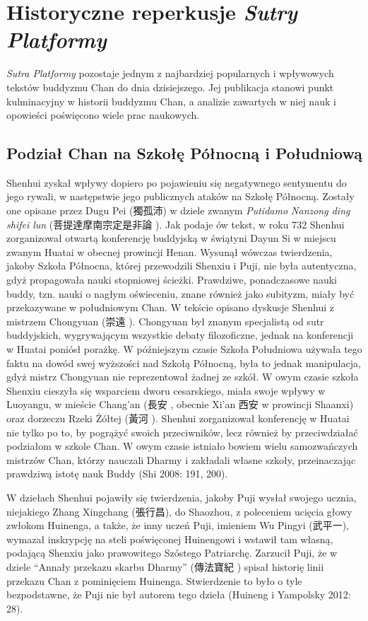 \chapter{Historyczne reperkusje \textit{Sutry Platformy}}
\label{ch:chapter_four}
\textit{Sutra Platformy} pozostaje jednym z najbardziej popularnych i wpływowych tekstów buddyzmu Chan do dnia dzisiejszego. Jej publikacja stanowi punkt kulminacyjny w historii buddyzmu Chan, a analizie zawartych w niej nauk i opowieści poświęcono wiele prac naukowych.

\section{Podział Chan na Szkołę Północną i Południową}
Shenhui zyskał wpływy dopiero po pojawieniu się negatywnego sentymentu do jego rywali, w następstwie jego publicznych ataków na Szkołę Północną.
Zostały one opisane przez Dugu Pei (獨孤沛) w dziele zwanym \textit{Putidamo Nanzong ding shifei lun} (菩提達摩南宗定是非論 ).
Jak podaje ów tekst, w roku 732 Shenhui zorganizował otwartą konferencję buddyjską w świątyni Dayun Si w miejscu zwanym Huatai w obecnej prowincji Henan.\label{Huatai}
Wysunął wówczas twierdzenia, jakoby Szkoła Północna, której przewodzili Shenxiu i Puji, nie była autentyczna, gdyż propagowała nauki stopniowej ścieżki.
Prawdziwe, ponadczasowe nauki buddy, tzn. nauki o nagłym oświeceniu, znane również jako subityzm, miały być przekazywane w południowym Chan.
W tekście opisano dyskusje Shenhui z mistrzem Chongyuan (崇遠 ).
Chongyuan był znanym specjalistą od sutr buddyjskich, wygrywającym wszystkie debaty filozoficzne, jednak na konferencji w Huatai poniósł porażkę.
W późniejszym czasie Szkoła Południowa używała tego faktu na dowód swej wyższości nad Szkołą Północną, była to jednak manipulacja, gdyż mistrz Chongyuan nie reprezentował żadnej ze szkół.
W owym czasie szkoła Shenxiu cieszyła się wsparciem dworu cesarskiego, miała swoje wpływy w Luoyangu, w mieście Chang'an (長安 , obecnie Xi'an 西安  w prowincji Shaanxi) oraz dorzeczu Rzeki Żółtej (黃河 ).
Shenhui zorganizował konferencję w Huatai nie tylko po to, by pogrążyć swoich przeciwników, lecz również by przeciwdziałać podziałom w szkole Chan.
W owym czasie istniało bowiem wielu samozwańczych mistrzów Chan, którzy nauczali Dharmy i zakładali własne szkoły, przeinaczając prawdziwą istotę nauk Buddy
(Shi 2008: 191, 200).

W dziełach Shenhui pojawiły się twierdzenia, jakoby Puji wysłał swojego ucznia, niejakiego Zhang Xingchang (張行昌), do Shaozhou, z poleceniem ucięcia głowy zwłokom Huinenga, a także, że inny uczeń Puji, imieniem Wu Pingyi (武平一), wymazał inskrypcję na steli poświęconej Huinengowi i wstawił tam własną, podającą Shenxiu jako prawowitego Szóstego Patriarchę.
Zarzucił Puji, że w dziele ``Annały przekazu skarbu Dharmy'' (傳法寶紀 ) spisał historię linii przekazu Chan z pominięciem Huinenga.
Stwierdzenie to było o tyle bezpodstawne, że Puji nie był autorem tego dzieła
(Huineng i Yampolsky 2012: 28).

